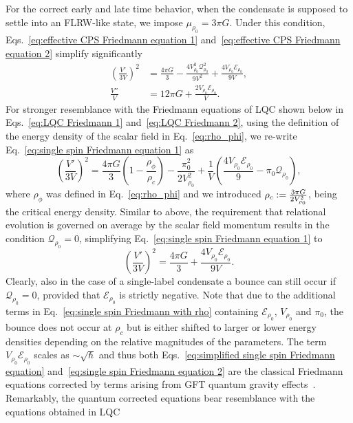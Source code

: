 \documentclass[11pt,a4paper]{article}
\newcommand{\defeq}{\vcentcolon=}
\begin{document}
For the correct early and late time behavior, when the condensate is supposed to settle into an FLRW-like state, we impose $\mu_{\rho_0} = 3\pi G$. Under this condition, Eqs.~\eqref{eq:effective CPS Friedmann equation 1} and~\eqref{eq:effective CPS Friedmann equation 2} simplify significantly~\cite{Marchetti:2020umh}
%
\begin{align}
\left(\frac{V'}{3V}\right)^2
& =
\frac{4\pi G}{3}-\frac{4V_{\rho_0}^2\mathcal{Q}_{\rho_0}^2}{9V^2}+\frac{4V_{\rho_0}\mathcal{E}_{\rho_0}}{9V},\label{eq:single spin Friedmann equation 1}\\[7pt]
\frac{V''}{V}
& =
12\pi G +\frac{2V_{\rho_0}\mathcal{E}_{\rho_0}}{V}.\label{eq:single spin Friedmann equation 2}
\end{align}
%
For stronger resemblance with the Friedmann equations of LQC shown below in Eqs.~\eqref{eq:LQC Friedmann 1} and~\eqref{eq:LQC Friedmann 2}, using the definition of the energy density of the scalar field in Eq.~\eqref{eq:rho_phi}, we re-write Eq.~\eqref{eq:single spin Friedmann equation 1} as
%
\begin{equation}\label{eq:single spin Friedmann with rho}
\left(\frac{V'}{3V}\right)^2
 =
\frac{4\pi G}{3}\left(1-\frac{\rho_{\phi}}{\rho_c}\right)
-
\frac{\pi_0^2}{2V_{\rho_0}^2}+\frac{1}{V}\left(\frac{4V_{\rho_0}\mathcal{E}_{\rho_0}}{9}-\pi_0\mathcal{Q}_{\rho_0}\right),
\end{equation}
%
where $\rho_{\phi}$ was defined in Eq.~\eqref{eq:rho_phi} and we introduced $\rho_c \defeq \frac{3\pi G}{2V_{\rho_0}^2}$, being the critical energy density. Similar to above, the requirement that relational evolution is governed on average by the scalar field momentum results in the condition $\mathcal{Q}_{\rho_0} = 0$, simplifying Eq.~\eqref{eq:single spin Friedmann equation 1} to
%
\begin{equation}\label{eq:simplified single spin Friedmann equation}
\left(\frac{V'}{3V}\right)^2
=
\frac{4\pi G}{3}+\frac{4V_{\rho_0}\mathcal{E}_{\rho_0}}{9V}.
\end{equation}
%
Clearly, also in the case of a single-label condensate a bounce can still occur if $\mathcal{Q}_{\rho_0} = 0$, provided that $\mathcal{E}_{\rho_0}$ is strictly negative. Note that due to the additional terms in Eq.~\eqref{eq:single spin Friedmann with rho} containing $\mathcal{E}_{\rho_0}$, $V_{\rho_0}$ and $\pi_0$, the bounce does not occur at $\rho_c$ but is either shifted to larger or lower energy densities depending on the relative magnitudes of the parameters. The term $V_{\rho_0}\mathcal{E}_{\rho_0}$ scales as $\sim\sqrt{\hbar}$ and thus both Eqs.~\eqref{eq:simplified single spin Friedmann equation} and~\eqref{eq:single spin Friedmann equation 2} are the classical Friedmann equations corrected by terms arising from GFT quantum gravity effects~\cite{Oriti:2016qtz}. Remarkably, the quantum corrected equations bear resemblance with the equations obtained in LQC
\end{document}

